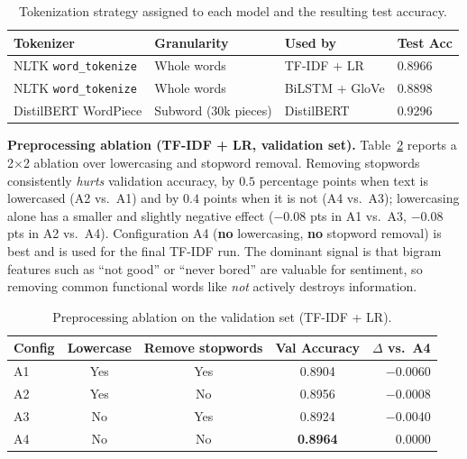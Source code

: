 \begin{table}[H]
\centering
\caption{Tokenization strategy assigned to each model and the resulting test accuracy.}
\label{tab:q1_tokenizers}
\begin{tabular}{llll}
\toprule
\textbf{Tokenizer} & \textbf{Granularity} & \textbf{Used by} & \textbf{Test Acc} \\
\midrule
NLTK \texttt{word\_tokenize} & Whole words           & TF-IDF + LR     & 0.8966 \\
NLTK \texttt{word\_tokenize} & Whole words           & BiLSTM + GloVe  & 0.8898 \\
DistilBERT WordPiece          & Subword (30k pieces)  & DistilBERT      & 0.9296 \\
\bottomrule
\end{tabular}
\end{table}

\textbf{Preprocessing ablation (TF-IDF + LR, validation set).} Table~\ref{tab:q1_preproc} reports a 2$\times$2 ablation over lowercasing and stopword removal. Removing stopwords consistently \emph{hurts} validation accuracy, by $0.5$ percentage points when text is lowercased (A2 vs.\ A1) and by $0.4$ points when it is not (A4 vs.\ A3); lowercasing alone has a smaller and slightly negative effect ($-0.08$ pts in A1 vs.\ A3, $-0.08$ pts in A2 vs.\ A4). Configuration A4 (\textbf{no} lowercasing, \textbf{no} stopword removal) is best and is used for the final TF-IDF run. The dominant signal is that bigram features such as ``not good'' or ``never bored'' are valuable for sentiment, so removing common functional words like \emph{not} actively destroys information.

\begin{table}[H]
\centering
\caption{Preprocessing ablation on the validation set (TF-IDF + LR).}
\label{tab:q1_preproc}
\begin{tabular}{lcccr}
\toprule
\textbf{Config} & \textbf{Lowercase} & \textbf{Remove stopwords} & \textbf{Val Accuracy} & \textbf{$\Delta$ vs.\ A4} \\
\midrule
A1 & Yes & Yes & 0.8904          & $-$0.0060 \\
A2 & Yes & No  & 0.8956          & $-$0.0008 \\
A3 & No  & Yes & 0.8924          & $-$0.0040 \\
A4 & No  & No  & \textbf{0.8964} & $0.0000$  \\
\bottomrule
\end{tabular}
\end{table}

